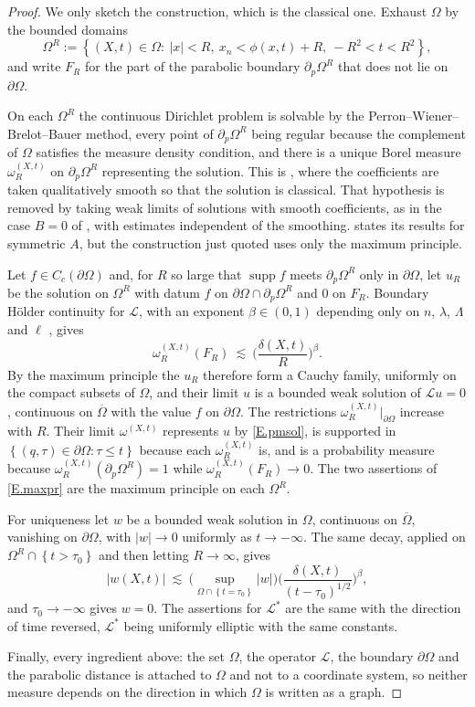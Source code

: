 \documentclass[12pt,leqno]{amsart}
\numberwithin{equation}{section}
\DeclareMathOperator{\supp}{supp}
\newcommand{\abs}[1]{\left\vert#1\right\vert}
\newcommand{\set}[1]{\left\{#1\right\}}
\newcommand{\om}{\Omega}
\newcommand{\pom}{\partial\Omega}
\newcommand{\pd}{\partial}
\newcommand{\LL}{\mathcal L}
\theoremstyle{plain}
\theoremstyle{remark}
\begin{document}
\begin{proof}
We only sketch the construction, which is the classical one. Exhaust $\om$ by
the bounded domains
$$\om^R:=\set{(X,t)\in\om:\ \abs x<R,\ x_n<\phi(x,t)+R,\ -R^2<t<R^2} ,$$
and write $F_R$ for the part of the parabolic boundary $\pd_p\om^R$ that does
not lie on $\pom$.\medskip

On each $\om^R$ the continuous Dirichlet problem is solvable by the
Perron--Wiener--Brelot--Bauer method, every point of $\pd_p\om^R$ being regular
because the complement of $\om$ satisfies the measure density condition, and
there is a unique Borel measure $\omega_R^{(X,t)}$ on $\pd_p\om^R$ representing
the solution. This is \cite[\S1]{N}, where the coefficients are taken
qualitatively smooth so that the solution is classical. That hypothesis is
removed by taking weak limits of solutions with smooth coefficients, as in
the case $B=0$ of \cite[Chapter I, \S3]{HLmem}, with estimates independent of
the smoothing.
\cite{N} states its results for symmetric $A$, but the construction just quoted
uses only the maximum principle.

Let $f\in C_c(\pom)$ and, for $R$ so large that $\supp f$ meets $\pd_p\om^R$
only in $\pom$, let $u_R$ be the solution on $\om^R$ with datum $f$ on
$\pom\cap\pd_p\om^R$ and $0$ on $F_R$. Boundary H\"older continuity for $\LL$,
with an exponent $\beta\in(0,1)$ depending only on $n$, $\lambda$, $\Lambda$
and $\ell$ \cite[Chapter I, Lemma 3.9]{HLmem}, gives
$$\omega_R^{(X,t)}(F_R)\ \lesssim\ \Big(\frac{\delta(X,t)}R\Big)^\beta .$$
By the maximum principle the $u_R$ therefore form a Cauchy family, uniformly on
the compact subsets of $\om$, and their limit $u$ is a bounded weak solution of
$\LL u=0$, continuous on $\overline\om$ with the value $f$ on $\pom$. The
restrictions $\omega_R^{(X,t)}\big|_{\pom}$ increase with $R$. Their limit
$\omega^{(X,t)}$ represents $u$ by \eqref{E.pmsol}, is supported in
$\set{(q,\tau)\in\pom:\tau\le t}$ because each $\omega^{(X,t)}_R$ is, and is a probability
measure because $\omega_R^{(X,t)}(\pd_p\om^R)=1$ while
$\omega_R^{(X,t)}(F_R)\to0$. The two assertions of \eqref{E.maxpr} are the
maximum principle on each $\om^R$.\medskip

For uniqueness let $w$ be a bounded weak solution in $\om$, continuous on
$\overline\om$, vanishing on $\pom$, with $\abs w\to0$ uniformly as
$t\to-\infty$. The same decay, applied on $\om^R\cap\set{t>\tau_0}$ and then
letting $R\to\infty$, gives
$$\abs{w(X,t)}\ \lesssim\ \Big(\sup_{\om\cap\set{t=\tau_0}}\abs w\Big)
  \Big(\frac{\delta(X,t)}{(t-\tau_0)^{1/2}}\Big)^\beta ,$$
and $\tau_0\to-\infty$ gives $w=0$. The assertions for $\LL^*$ are the same
with the direction of time reversed, $\LL^*$ being uniformly elliptic with the
same constants.

Finally, every ingredient above: the set $\om$, the operator $\LL$, the
boundary $\pom$ and the parabolic distance is attached to $\om$ and not to a
coordinate system, so neither measure depends on the direction in which $\om$ is
written as a graph.
\end{proof}
\end{document}
